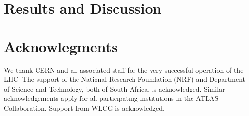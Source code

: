 \documentclass[a4paper]{jpconf}
\begin{document}
\section{Results and Discussion}


%
%




%

\section{Acknowlegments}
We thank CERN and all associated staff for the very successful operation of the LHC.
The support of the National Research Foundation (NRF) and Department of Science and Technology, both of South Africa, is acknowledged. Similar acknowledgements apply for all participating institutions in the ATLAS Collaboration. Support from  WLCG is acknowledged.
\end{document}
